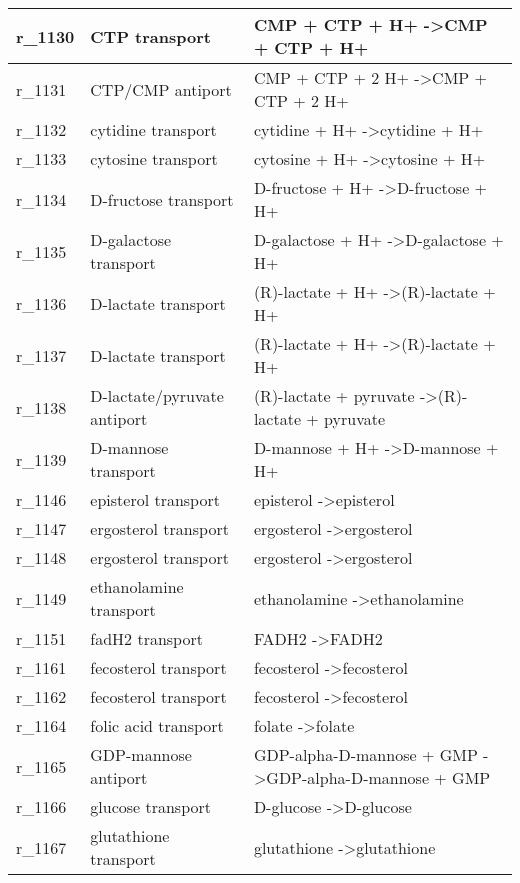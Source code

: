 \begin{landscape}
{\begin{longtable}{|l|p{7cm}|p{15cm}|}
r\_1130 & CTP transport & CMP + CTP + H+  -\textgreater CMP + CTP + H+ \\ \hline
r\_1131 & CTP/CMP antiport & CMP + CTP + 2 H+  -\textgreater CMP + CTP + 2 H+ \\ \hline
r\_1132 & cytidine transport & cytidine + H+  -\textgreater cytidine + H+ \\ \hline
r\_1133 & cytosine transport & cytosine + H+  -\textgreater cytosine + H+ \\ \hline
r\_1134 & D-fructose transport & D-fructose + H+  -\textgreater D-fructose + H+ \\ \hline
r\_1135 & D-galactose transport & D-galactose + H+  -\textgreater D-galactose + H+ \\ \hline
r\_1136 & D-lactate transport & (R)-lactate + H+  -\textgreater (R)-lactate + H+ \\ \hline
r\_1137 & D-lactate transport & (R)-lactate + H+  -\textgreater (R)-lactate + H+ \\ \hline
r\_1138 & D-lactate/pyruvate antiport & (R)-lactate + pyruvate  -\textgreater (R)-lactate + pyruvate \\ \hline
r\_1139 & D-mannose transport & D-mannose + H+  -\textgreater D-mannose + H+ \\ \hline
r\_1146 & episterol transport & episterol  -\textgreater episterol \\ \hline
r\_1147 & ergosterol transport & ergosterol  -\textgreater ergosterol \\ \hline
r\_1148 & ergosterol transport & ergosterol  -\textgreater ergosterol \\ \hline
r\_1149 & ethanolamine transport & ethanolamine  -\textgreater ethanolamine \\ \hline
r\_1151 & fadH2 transport & FADH2  -\textgreater FADH2 \\ \hline
r\_1161 & fecosterol transport & fecosterol  -\textgreater fecosterol \\ \hline
r\_1162 & fecosterol transport & fecosterol  -\textgreater fecosterol \\ \hline
r\_1164 & folic acid transport & folate  -\textgreater folate \\ \hline
r\_1165 & GDP-mannose antiport & GDP-alpha-D-mannose + GMP  -\textgreater GDP-alpha-D-mannose + GMP \\ \hline
r\_1166 & glucose transport & D-glucose  -\textgreater D-glucose \\ \hline
r\_1167 & glutathione transport & glutathione  -\textgreater glutathione \\ \hline

\end{longtable}}
\end{landscape}

